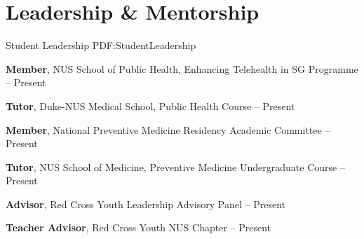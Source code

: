 \documentclass[letterpaper,10pt,oneside]{article}
\begin{document}
\begin{body}
\begin{enumerate}



\end{enumerate}



\section
{Leadership \& Mentorship}
{Student Leadership}
{PDF:StudentLeadership}


\textbf{Member}, NUS School of Public Health, Enhancing Telehealth in SG Programme
\hfill
{} -- Present
\GapNoBreak

\textbf{Tutor}, Duke-NUS Medical School, Public Health Course
\hfill
{} -- Present
\GapNoBreak

\textbf{Member}, National Preventive Medicine Residency Academic Committee
\hfill
{} -- Present
\GapNoBreak

\textbf{Tutor}, NUS School of Medicine, Preventive Medicine Undergraduate Course
\hfill
{} -- Present
\GapNoBreak

\textbf{Advisor}, Red Cross Youth Leadership Advisory Panel
\hfill
{} -- Present
\GapNoBreak

\textbf{Teacher Advisor}, Red Cross Youth NUS Chapter
\hfill
{} -- Present
\GapNoBreak


\end{body}
\end{document}
